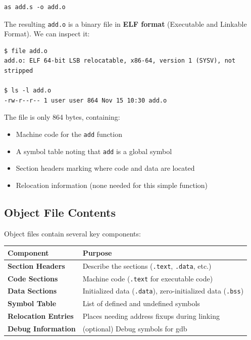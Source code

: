 \begin{verbatim}
as add.s -o add.o
\end{verbatim}

The resulting \texttt{add.o} is a binary file in \textbf{ELF format} (Executable and Linkable Format). We can inspect it:

\begin{verbatim}
$ file add.o
add.o: ELF 64-bit LSB relocatable, x86-64, version 1 (SYSV), not stripped

$ ls -l add.o
-rw-r--r-- 1 user user 864 Nov 15 10:30 add.o
\end{verbatim}

The file is only 864 bytes, containing:
\begin{itemize}
    \item Machine code for the \texttt{add} function
    \item A symbol table noting that \texttt{add} is a global symbol
    \item Section headers marking where code and data are located
    \item Relocation information (none needed for this simple function)
\end{itemize}

\subsection{Object File Contents}

Object files contain several key components:

\begin{center}
\begin{tabular}{|l|l|}
\hline
\textbf{Component} & \textbf{Purpose} \\
\hline
\textbf{Section Headers} & Describe the sections (\texttt{.text}, \texttt{.data}, etc.) \\
\hline
\textbf{Code Sections} & Machine code (\texttt{.text} for executable code) \\
\hline
\textbf{Data Sections} & Initialized data (\texttt{.data}), zero-initialized data (\texttt{.bss}) \\
\hline
\textbf{Symbol Table} & List of defined and undefined symbols \\
\hline
\textbf{Relocation Entries} & Places needing address fixups during linking \\
\hline
\textbf{Debug Information} & (optional) Debug symbols for gdb \\
\hline
\end{tabular}
\end{center}

